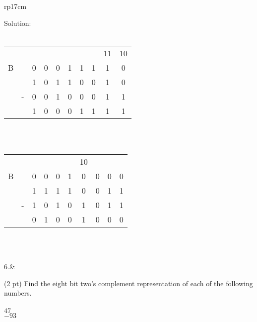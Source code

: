 \documentclass{article}
\begin{document}
\begin{longtable}[l]{rp{17cm}}
\begin{minipage}[t]{\linewidth}
Solution: \\
\\
\begin{tabular}{cccccccccc}
    &   &   &   &   &   &   &   & 11& 10\\
  B &   & 0 & 0 & 0 & 1 & 1 & 1 & 1 & 0 \\
    &   & 1 & 0 & 1 & 1 & 0 & 0 & 1 & 0 \\
    & - & 0 & 0 & 1 & 0 & 0 & 0 & 1 & 1 \\
  \hline
    &   & 1 & 0 & 0 & 0 & 1 & 1 & 1 & 1 \\
\end{tabular} \\
\\
\begin{tabular}{cccccccccc}
    &   &   &   &   &   & 10&   &   &   \\
  B &   & 0 & 0 & 0 & 1 & 0 & 0 & 0 & 0 \\
    &   & 1 & 1 & 1 & 1 & 0 & 0 & 1 & 1 \\
    & - & 1 & 0 & 1 & 0 & 1 & 0 & 1 & 1 \\
  \hline
    &   & 0 & 1 & 0 & 0 & 1 & 0 & 0 & 0 \\
\end{tabular} \\
\end{minipage}\\
\medskip
6.&\begin{minipage}[t]{\linewidth}(2 pt) Find the eight bit two's complement representation of each of the following numbers. \\
\\
$47$ \\
$-93$ \\


\end{minipage}
\end{longtable}
\end{document}
